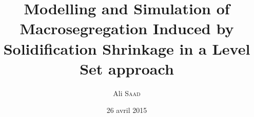 \documentclass[a4paper, 12pt, twoside]{book}
\author{Ali \textsc{Saad}}
\title{Modelling and Simulation of Macrosegregation Induced by Solidification Shrinkage in a Level Set approach}
\date{26 avril 2015}
\begin{document}
\pagedegarde
\end{document}
